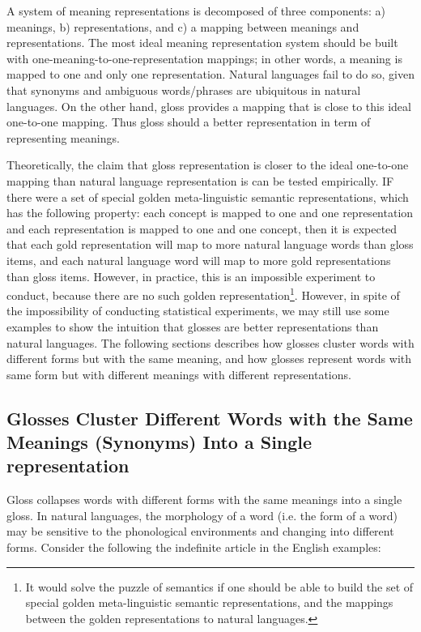 A system of meaning representations is decomposed of three components: a) meanings, b) representations, and c) a mapping between meanings and representations. The most ideal meaning representation system should be built with one-meaning-to-one-representation mappings; in other words, a meaning is mapped to one and only one representation. Natural languages fail to do so, given that synonyms and ambiguous words/phrases are ubiquitous in natural languages. On the other hand, gloss provides a mapping that is close to this ideal one-to-one mapping. Thus gloss should a better representation in term of representing meanings. 

Theoretically, the claim that gloss representation is closer to the ideal one-to-one mapping than natural language representation is can be tested empirically. IF there were a set of special golden meta-linguistic semantic representations, which has the following property: each concept is mapped to one and one representation and each representation is mapped to one and one concept, then it is expected that each gold representation will map to more natural language words than gloss items, and each natural language word will map to more gold representations than gloss items. However, in practice, this is an impossible experiment to conduct, because there are no such golden representation\footnote{It would solve the puzzle of semantics if one should be able to build the set of special golden meta-linguistic semantic representations, and the mappings between the golden representations to natural languages.}. However, in spite of the impossibility of conducting statistical experiments, we may still use some examples to show the intuition that glosses are better representations than natural languages. The following sections describes how glosses cluster words with different forms but with the same meaning, and how glosses represent words with same form but with different meanings with different representations. 

\subsection{Glosses Cluster Different Words with the Same Meanings (Synonyms) Into a Single representation}
Gloss collapses words with different forms with the same meanings into a single gloss. In natural languages, the morphology of a word (i.e. the form of a word) may be sensitive to the phonological environments and changing into different forms. Consider the following the indefinite article in the English examples: 

